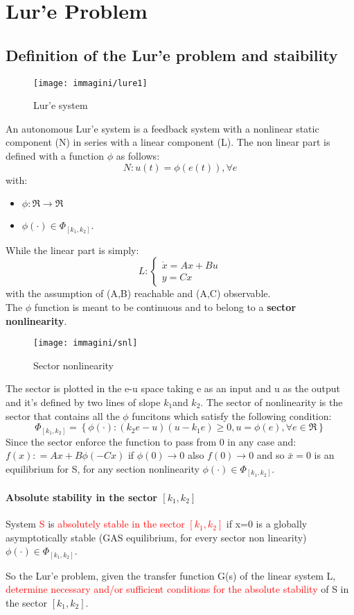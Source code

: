 \chapter{Lur'e Problem}
\section{Definition of the Lur'e problem and staibility}
\begin{figure}[H]
	\centering
	\texttt{[image: immagini/lure1]}
	\caption{Lur'e system}
	\label{fig:lure1}
\end{figure}
An autonomous Lur'e system is a feedback system with a nonlinear static component (N) in series with a linear component (L). The non linear part is defined with a function $\phi$ as follows: 
\[
N \colon u(t)=\phi(e(t)), \forall e 
\]with:
\begin{itemize}
		\item $\phi \colon \Re \to \Re$
		\item $\phi(\cdot) \in \Phi_{\left[k_1,k_2\right]}$.
\end{itemize}
While the linear part is simply:
\[
L:  \begin{cases}
	\dot{x}=Ax+Bu \\ y=Cx
\end{cases}
\] with the assumption of (A,B) reachable and (A,C) observable.
\\ The $\phi$ function is meant to be continuous and to belong to a \textbf{sector nonlinearity}.
\begin{figure}[H]
	\centering
	\texttt{[image: immagini/snl]}
	\caption{Sector nonlinearity}
	\label{fig:snl}
\end{figure}
The sector is plotted in the e-u space taking e as an input and u as the output and it's defined by two lines of slope $k_1$and $k_2$. The sector of nonlinearity is the sector that contains all the $\phi$ funcitons which satisfy the following condition:
\[
\Phi_{\left[k_1,k_2\right]}=\left\{\phi(\cdot)\colon (k_2e-u)(u-k_1e)\ge 0, u=\phi(e), \forall e \in \Re\right\}
\]
Since the sector enforce the function to pass from 0 in any case and: $f(x)\colon=Ax+B\phi(-Cx)$ if $\phi(0)\to 0$ also $f(0)\to 0$ and so $\bar{x}=0$ is an equilibrium for S, for any section nonlinearity $\phi(\cdot) \in \Phi_{\left[k_1,k_2\right]}$.
\subsubsection{Absolute stability in the sector $[k_1,k_2]$}
\begin{defn}
	System \textcolor{red}{S} is \textcolor{red}{absolutely stable in the sector $[k_1,k_2]$} if x=0 is a globally asymptotically stable (GAS equilibrium, for every sector non linearity) $\phi(\cdot) \in \Phi_{\left[k_1,k_2\right]}$.
\end{defn}
So the Lur'e problem, given the transfer function G(s) of the linear system L, \textcolor{red}{determine necessary and/or sufficient conditions for the absolute stability} of S in the sector $[k_1,k_2]$.
